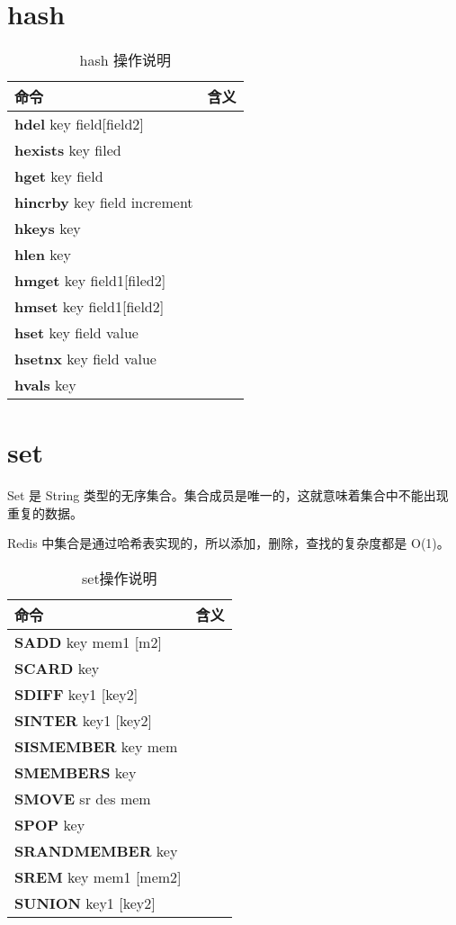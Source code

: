 \documentclass[UTF8,a4paper,12pt]{ctexbook}
\begin{document}
	\section{hash}
		\begin{table}[H]
			\centering
			\caption{hash 操作说明}
			\begin{tabular}{p{5cm}<{\centering} | p{10cm}<{\centering}}
				\toprule
					命令 &  含义 \\
				\midrule
					\textbf{hdel} key field[field2]&  	\\
					\textbf{hexists} key filed & 		\\
					\textbf{hget} key field &			\\
					\textbf{hincrby} key field increment &		\\
					\textbf{hkeys} key &					\\
					\textbf{hlen} key &					\\
					\textbf{hmget} key field1[filed2] & 	\\
					\textbf{hmset} key field1[field2] & 	\\
					\textbf{hset} key field value & 		\\
					\textbf{hsetnx} key field value &	\\
					\textbf{hvals} key & 				\\
				\bottomrule
			\end{tabular}
		\end{table}
		
	\section{set}
		Set 是 String 类型的无序集合。集合成员是唯一的，这就意味着集合中不能出现重复的数据。
		
		Redis 中集合是通过哈希表实现的，所以添加，删除，查找的复杂度都是 O(1)。
		
		\begin{table}[H]
			\centering
			\caption{set操作说明}
			\begin{tabular}{p{5cm}<{\centering} | p{10cm}<{\centering}}
				\toprule
					命令 &  含义 \\
				\midrule
				\textbf{SADD} key mem1 [m2] 	 &  	\\
				\textbf{SCARD} key 	 & 		\\
				\textbf{SDIFF} key1 [key2] 	 &		\\
				\textbf{SINTER} key1 [key2] 	 &		\\
				\textbf{SISMEMBER} key mem 	 &		\\
				\textbf{SMEMBERS} key 	 &		\\
				\textbf{SMOVE} sr des mem 	 & 		\\
				\textbf{SPOP} key 	 & 		\\
				\textbf{SRANDMEMBER} key	 & 		\\
				\textbf{SREM} key mem1 [mem2] 	 &		\\
				\textbf{SUNION} key1 [key2] 	 & 		\\
				\bottomrule
			\end{tabular}
		\end{table}	
		
\end{document}
